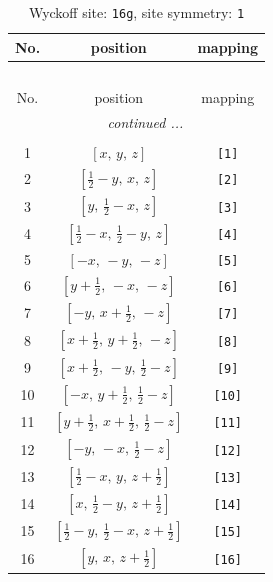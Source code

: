 \documentclass[fleqn,8pt]{jsarticle}
\begin{document}
\begin{longtable}{ccc}
\caption{Wyckoff site: {\tt 16g}, site symmetry: {\tt 1}}
 \\
 \hline \hline
No. & position & mapping \\ \hline \endfirsthead

\multicolumn{2}{l}{\tablename\ \thetable{}} \\
 \hline \hline
No. & position & mapping \\ \hline \endhead

 \hline \hline
\multicolumn{2}{r}{\footnotesize\it continued ...} \\ \endfoot

 \hline \hline
\multicolumn{2}{r}{} \\ \endlastfoot

1 & $\left[ x,\, y,\, z \right]$ & {\tt [1]} \\ \hline
2 & $\left[ \frac{1}{2} - y,\, x,\, z \right]$ & {\tt [2]} \\ \hline
3 & $\left[ y,\, \frac{1}{2} - x,\, z \right]$ & {\tt [3]} \\ \hline
4 & $\left[ \frac{1}{2} - x,\, \frac{1}{2} - y,\, z \right]$ & {\tt [4]} \\ \hline
5 & $\left[ - x,\, - y,\, - z \right]$ & {\tt [5]} \\ \hline
6 & $\left[ y + \frac{1}{2},\, - x,\, - z \right]$ & {\tt [6]} \\ \hline
7 & $\left[ - y,\, x + \frac{1}{2},\, - z \right]$ & {\tt [7]} \\ \hline
8 & $\left[ x + \frac{1}{2},\, y + \frac{1}{2},\, - z \right]$ & {\tt [8]} \\ \hline
9 & $\left[ x + \frac{1}{2},\, - y,\, \frac{1}{2} - z \right]$ & {\tt [9]} \\ \hline
10 & $\left[ - x,\, y + \frac{1}{2},\, \frac{1}{2} - z \right]$ & {\tt [10]} \\ \hline
11 & $\left[ y + \frac{1}{2},\, x + \frac{1}{2},\, \frac{1}{2} - z \right]$ & {\tt [11]} \\ \hline
12 & $\left[ - y,\, - x,\, \frac{1}{2} - z \right]$ & {\tt [12]} \\ \hline
13 & $\left[ \frac{1}{2} - x,\, y,\, z + \frac{1}{2} \right]$ & {\tt [13]} \\ \hline
14 & $\left[ x,\, \frac{1}{2} - y,\, z + \frac{1}{2} \right]$ & {\tt [14]} \\ \hline
15 & $\left[ \frac{1}{2} - y,\, \frac{1}{2} - x,\, z + \frac{1}{2} \right]$ & {\tt [15]} \\ \hline
16 & $\left[ y,\, x,\, z + \frac{1}{2} \right]$ & {\tt [16]} \\
\end{longtable}
\end{document}
